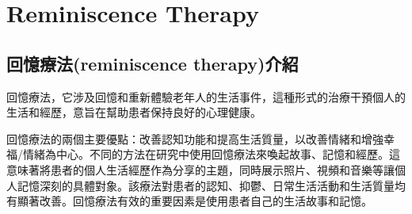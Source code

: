 \chapter{Reminiscence Therapy}
\label{chapter:intro}
\section{回憶療法(reminiscence therapy)介紹}
回憶療法，它涉及回憶和重新體驗老年人的生活事件，這種形式的治療干預個人的生活和經歷，意旨在幫助患者保持良好的心理健康。

回憶療法的兩個主要優點：改善認知功能和提高生活質量，以改善情緒和增強幸福/情緒為中心。不同的方法在研究中使用回憶療法來喚起故事、記憶和經歷。這意味著將患者的個人生活經歷作為分享的主題，同時展示照片、視頻和音樂等讓個人記憶深刻的具體對象。該療法對患者的認知、抑鬱、日常生活活動和生活質量均有顯著改善。回憶療法有效的重要因素是使用患者自己的生活故事和記憶。

